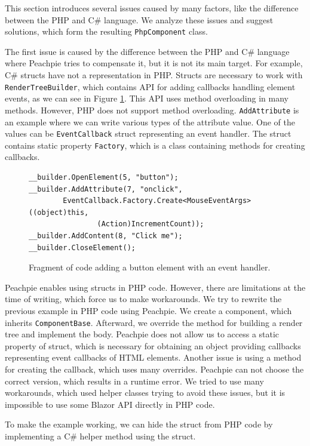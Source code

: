 This section introduces several issues caused by many factors, like the difference between the PHP and C\# language.
We analyze these issues and suggest solutions, which form the resulting \texttt{PhpComponent} class.
\par
The first issue is caused by the difference between the PHP and C\# language where Peachpie tries to compensate it, but it is not its main target. 
For example, C\# structs have not a representation in PHP.
Structs are necessary to work with \texttt{RenderTreeBuilder}, which contains API for adding callbacks handling element events, as we can see in Figure \ref{img14:callback}.
This API uses method overloading in many methods.
However, PHP does not support method overloading.
\texttt{AddAttribute} is an example where we can write various types of the attribute value.
One of the values can be \texttt{EventCallback} struct representing an event handler.
The struct contains static property \texttt{Factory}, which is a class containing methods for creating callbacks.
\par
\begin{figure}
\begin{lstlisting}
__builder.OpenElement(5, "button");
__builder.AddAttribute(7, "onclick", 
		EventCallback.Factory.Create<MouseEventArgs>((object)this, 
				(Action)IncrementCount));
__builder.AddContent(8, "Click me");
__builder.CloseElement();
\end{lstlisting}
\caption{Fragment of code adding a button element with an event handler.}
\label{img14:callback}
\end{figure}
\par
Peachpie enables using structs in PHP code. 
However, there are limitations at the time of writing, which force us to make workarounds.
We try to rewrite the previous example in PHP code using Peachpie.
We create a component, which inherits \texttt{ComponentBase}. 
Afterward, we override the method for building a render tree and implement the body.
Peachpie does not allow us to access a static property of struct, which is necessary for obtaining an object providing callbacks representing event callbacks of HTML elements.
Another issue is using a method for creating the callback, which uses many overrides.
Peachpie can not choose the correct version, which results in a runtime error.
We tried to use many workarounds, which used helper classes trying to avoid these issues, but it is impossible to use some Blazor API directly in PHP code.
\par
To make the example working, we can hide the struct from PHP code by implementing a C\# helper method using the struct.
